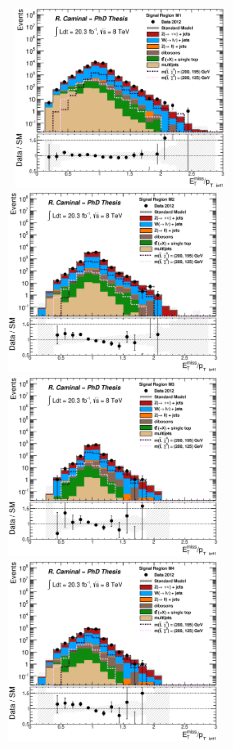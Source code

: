 \begin{figure}[!ht]
  \begin{center}
    \mbox{
      \includegraphics[width=0.495\textwidth]{MonojetAnalysis/Figures/plot_Stop_A6_SR_metpt1_fitted.eps}
      \includegraphics[width=0.495\textwidth]{MonojetAnalysis/Figures/plot_Stop_A3_SR_metpt1_fitted.eps}
    }
    \mbox{
      \includegraphics[width=0.495\textwidth]{MonojetAnalysis/Figures/plot_Stop_A4_SR_metpt1_fitted.eps}
      \includegraphics[width=0.495\textwidth]{MonojetAnalysis/Figures/plot_Stop_A8_SR_metpt1_fitted.eps}
}
\end{center}
\end{figure}
